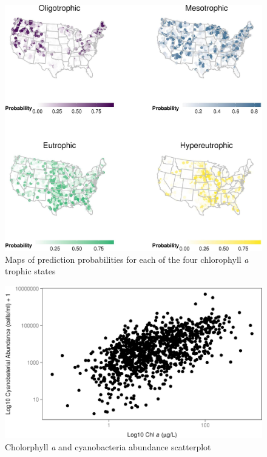 \documentclass[12pt,]{article}
\begin{document}
\begin{figure}[htbp]
\centering
\includegraphics{manuscript_files/figure-latex/gis_probability_map-1.jpeg}
\caption{Maps of prediction probabilities for each of the four
chlorophyll \textit{a} trophic states \label{fig:gis_probability_map}}
\end{figure}

\newpage

\newpage

\newpage

\begin{figure}[htbp]
\centering
\includegraphics{manuscript_files/figure-latex/chla_cyano_scatterplot-1.jpeg}
\caption{Cholorphyll \emph{a} and cyanobacteria abundance
scatterplot\label{fig:scatterplot}}
\end{figure}
\end{document}
